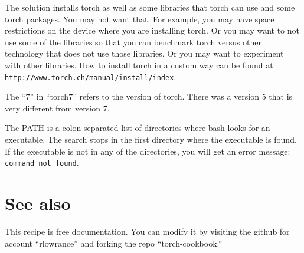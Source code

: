 \documentclass{article}
\let\code\texttt %
\begin{document}
The solution installs torch as well as some libraries that torch can use
and some torch packages. You may not want that. For example, you may
have space restrictions on the device where you are installing torch. Or
you may want to not use some of the libraries so that you can benchmark
torch versus other technology that does not use those libraries. Or you
may want to experiment with other libraries. How to
install torch in a custom way can be found at
\code{http://www.torch.ch/manual/install/index}. 

The ``7'' in ``torch7'' refers to the version of
torch. There was a version 5 that is very different from version 7.

The PATH is a colon-separated list of directories where bash looks for
an executable. The search stops in the first directory where the
executable is found. If the executable is not in any of the directories,
you will get an error message: \code{command not found}.
\section{See also}

This recipe is free documentation. You can modify it by visiting the
github for account ``rlowrance'' and forking the repo
``torch-cookbook.''
\end{document}
